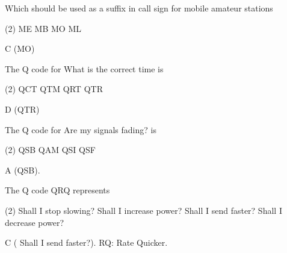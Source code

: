\documentclass[a4paper]{article}
\begin{document}
\vspace{5mm}



\begin{question}Which should be used as a suffix in call sign for mobile amateur stations
	\begin{tasks}(2)
		\task ME
		\task MB
		\task MO
		\task ML
	\end{tasks}
\end{question}

\begin{solution}
	C (MO)
\end{solution}

\vspace{5mm}



\begin{question}The Q code for \apostrophe{}What is the correct time\apostrophe{} is
	\begin{tasks}(2)
		\task QCT
		\task QTM
		\task QRT
		\task QTR
	\end{tasks}
\end{question}

\begin{solution}
	D (QTR)
\end{solution}

\vspace{5mm}



\begin{question}The Q code for \apostrophe{}Are my signals fading?\apostrophe{} is
	\begin{tasks}(2)
		\task QSB
		\task QAM
		\task QSI
		\task QSF
	\end{tasks}
\end{question}

\begin{solution}
	A (QSB).
\end{solution}

\vspace{5mm}



\begin{question}The Q code QRQ represents
	\begin{tasks}(2)
		\task Shall I stop slowing?
		\task Shall I increase power?
		\task Shall I send faster?
		\task Shall I decrease power?
	\end{tasks}
\end{question}

\begin{solution}
	C ( Shall I send faster?). RQ: Rate Quicker.
\end{solution}
\end{document}
